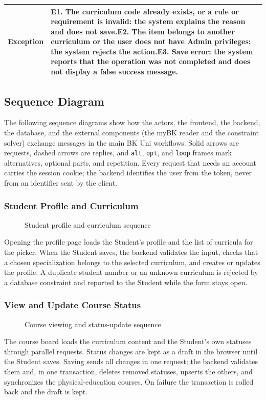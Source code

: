 \begin{longtable}{|p{}|p{}|}
\hline
\textbf{Exception} & E1. The curriculum code already exists, or a rule or requirement is invalid: the system explains the reason and does not save.\newline E2. The item belongs to another curriculum or the user does not have Admin privileges: the system rejects the action.\newline E3. Save error: the system reports that the operation was not completed and does not display a false success message. \\
\hline
\end{longtable}

\subsection{Sequence Diagram}

The following sequence diagrams show how the actors, the frontend, the backend, the database, and the external components (the myBK reader and the constraint solver) exchange messages in the main BK Uni workflows. Solid arrows are requests, dashed arrows are replies, and \texttt{alt}, \texttt{opt}, and \texttt{loop} frames mark alternatives, optional parts, and repetition. Every request that needs an account carries the session cookie; the backend identifies the user from the token, never from an identifier sent by the client.

\subsubsection{Student Profile and Curriculum}
\begin{figure}[H]
    \centering
    
    \caption{Student profile and curriculum sequence}
\end{figure}
Opening the profile page loads the Student's profile and the list of curricula for the picker. When the Student saves, the backend validates the input, checks that a chosen specialization belongs to the selected curriculum, and creates or updates the profile. A duplicate student number or an unknown curriculum is rejected by a database constraint and reported to the Student while the form stays open.

\subsubsection{View and Update Course Status}
\begin{figure}[H]
    \centering
    
    \caption{Course viewing and status-update sequence}
\end{figure}
The course board loads the curriculum content and the Student's own statuses through parallel requests. Status changes are kept as a draft in the browser until the Student saves. Saving sends all changes in one request; the backend validates them and, in one transaction, deletes removed statuses, upserts the others, and synchronizes the physical-education courses. On failure the transaction is rolled back and the draft is kept.

